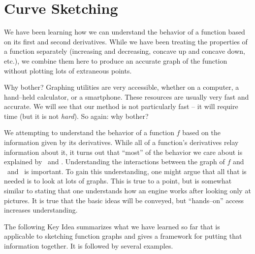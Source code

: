 \section{Curve Sketching}\label{sec:sketch}


We have been learning how we can understand the behavior of a function based on its first and second derivatives. While we have been treating the properties of a function separately (increasing and decreasing, concave up and concave down, etc.), we combine them here to produce an accurate graph of the function without plotting lots of extraneous points.

Why bother? Graphing utilities are very accessible, whether on a computer, a hand--held calculator, or a smartphone. These resources are usually very fast and accurate. We will see that our method is not particularly fast -- it will require time (but it is not \textit{hard}). So again: why bother?

We attempting to understand the behavior of a function $f$ based on the information given by its derivatives. While all of a function's derivatives relay information about it, it turns out that ``most'' of the behavior we care about is explained by \fp\ and \fpp. Understanding the interactions between the graph of $f$ and \fp\ and \fpp\ is important. To gain this understanding, one might argue that all that is needed is to look at lots of graphs. This is true to a point, but is somewhat similar to stating that one understands how an engine works after looking only at pictures. It is true that the basic ideas will be conveyed, but ``hands--on'' access increases understanding.

The following Key Idea summarizes what we have learned so far that is applicable to sketching function graphs and gives a framework for putting that information together. It is followed by several examples.

